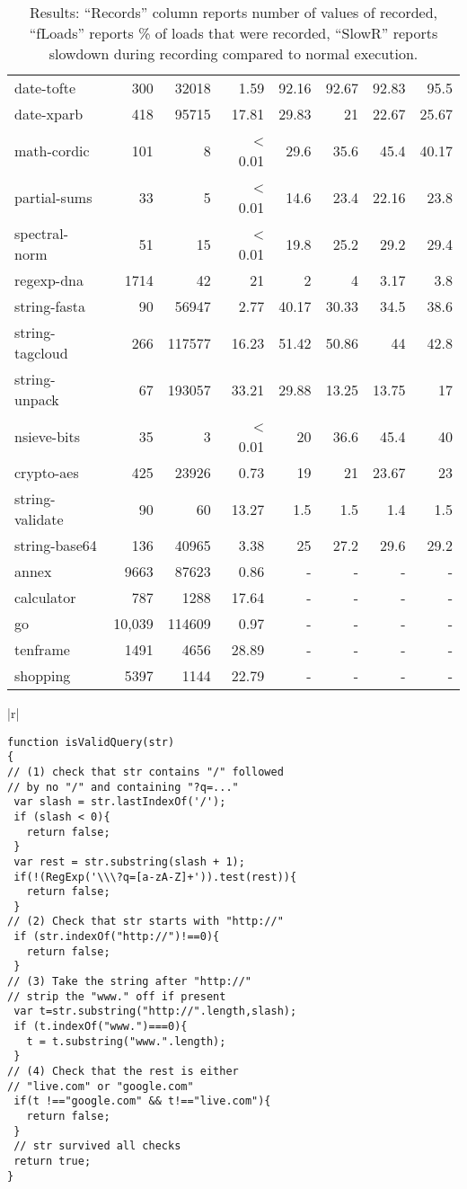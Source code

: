 \documentclass{sig-alternate}
\begin{document}
\begin{table*}
\begin{minipage}{0.6\textwidth}
{\begin{center}
\begin{tabular}{|l|r|r|r|r|r|r|r|}
date-tofte& 300 & 32018 & 1.59 & 92.16 & 92.67 & 92.83 & 95.5\\
date-xparb& 418 & 95715 & 17.81 & 29.83 & 21 & 22.67 & 25.67\\
math-cordic& 101 & 8 & < 0.01 & 29.6 & 35.6 & 45.4 & 40.17\\
partial-sums& 33 & 5 & < 0.01& 14.6 & 23.4 & 22.16& 23.8\\
spectral-norm& 51 & 15 & < 0.01& 19.8& 25.2 & 29.2 & 29.4\\
regexp-dna& 1714 & 42 & 21 & 2 & 4 & 3.17 & 3.8\\
string-fasta& 90 & 56947 & 2.77 & 40.17 & 30.33 & 34.5 & 38.6\\
string-tagcloud& 266 & 117577 & 16.23 & 51.42 & 50.86 & 44 & 42.8\\
string-unpack& 67 & 193057 & 33.21 & 29.88 & 13.25 & 13.75 & 17\\
nsieve-bits& 35 & 3 & < 0.01 & 20 & 36.6 & 45.4 & 40 \\
crypto-aes& 425 & 23926 &0.73  & 19 & 21 & 23.67 & 23 \\
string-validate& 90 & 60 & 13.27 & 1.5 & 1.5 & 1.4 & 1.5\\
string-base64& 136 & 40965 & 3.38 & 25 & 27.2 & 29.6 & 29.2\\
\hline 
annex& 9663 & 87623 & 0.86 & - & - & - & - \\
calculator& 787 & 1288 & 17.64 & - & - & - & - \\
 go& 10,039 & 114609 & 0.97 & - & - & - & - \\
tenframe& 1491 &4656 & 28.89 & - & - & - & - \\
shopping& 5397 & 1144 & 22.79 & - & - & - & - \\
\hline 
\end{tabular}
\end{center}}
\caption{Results: ``Records'' column reports number of values of recorded,
``fLoads'' reports \% of loads that were recorded, ``SlowR'' reports
slowdown during recording compared to normal execution.}
\label{tab:results}
\end{minipage}
\begin{minipage}{0.38\textwidth}
\begin{tabular}{|r|}
\hline\\
{\scriptsize
\begin{lstlisting}[mathescape]
function isValidQuery(str)
{
// (1) check that str contains "/" followed
// by no "/" and containing "?q=..."
 var slash = str.lastIndexOf('/');
 if (slash < 0){
   return false;
 }
 var rest = str.substring(slash + 1);
 if(!(RegExp('\\\?q=[a-zA-Z]+')).test(rest)){
   return false;
 }
// (2) Check that str starts with "http://"
 if (str.indexOf("http://")!==0){
   return false;
 }
// (3) Take the string after "http://"
// strip the "www." off if present
 var t=str.substring("http://".length,slash);
 if (t.indexOf("www.")===0){
   t = t.substring("www.".length);
 }
// (4) Check that the rest is either
// "live.com" or "google.com"
 if(t !=="google.com" && t!=="live.com"){
   return false;
 }
 // str survived all checks
 return true;
}


\end{lstlisting}}
\end{tabular}
\end{minipage}
\end{table*}
\end{document}
